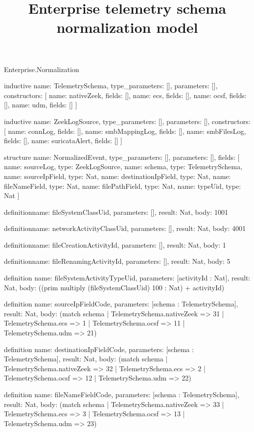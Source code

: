\begin{lexlean}{Enterprise.Normalization}
\title{Enterprise telemetry schema normalization model}
\begin{semanticmodule}
inductive{
  name: TelemetrySchema,
  type_parameters: [],
  parameters: [],
  constructors: [
    {name: nativeZeek, fields: []},
    {name: ecs, fields: []},
    {name: ocsf, fields: []},
    {name: udm, fields: []}
  ]
}

inductive{
  name: ZeekLogSource,
  type_parameters: [],
  parameters: [],
  constructors: [
    {name: connLog, fields: []},
    {name: smbMappingLog, fields: []},
    {name: smbFilesLog, fields: []},
    {name: suricataAlert, fields: []}
  ]
}

structure{
  name: NormalizedEvent,
  type_parameters: [],
  parameters: [],
  fields: [
    {name: sourceLog, type: ZeekLogSource},
    {name: schema, type: TelemetrySchema},
    {name: sourceIpField, type: Nat},
    {name: destinationIpField, type: Nat},
    {name: fileNameField, type: Nat},
    {name: filePathField, type: Nat},
    {name: typeUid, type: Nat}
  ]
}

definition{name: fileSystemClassUid, parameters: [], result: Nat, body: 1001}

definition{name: networkActivityClassUid, parameters: [], result: Nat, body: 4001}

definition{name: fileCreationActivityId, parameters: [], result: Nat, body: 1}

definition{name: fileRenamingActivityId, parameters: [], result: Nat, body: 5}

definition{
  name: fileSystemActivityTypeUid,
  parameters: [activityId : Nat],
  result: Nat,
  body: ((prim multiply (fileSystemClassUid) 100 : Nat) + activityId)
}

definition{
  name: sourceIpFieldCode,
  parameters: [schema : TelemetrySchema],
  result: Nat,
  body: (match schema
    | TelemetrySchema.nativeZeek => 31
    | TelemetrySchema.ecs => 1
    | TelemetrySchema.ocsf => 11
    | TelemetrySchema.udm => 21)
}

definition{
  name: destinationIpFieldCode,
  parameters: [schema : TelemetrySchema],
  result: Nat,
  body: (match schema
    | TelemetrySchema.nativeZeek => 32
    | TelemetrySchema.ecs => 2
    | TelemetrySchema.ocsf => 12
    | TelemetrySchema.udm => 22)
}

definition{
  name: fileNameFieldCode,
  parameters: [schema : TelemetrySchema],
  result: Nat,
  body: (match schema
    | TelemetrySchema.nativeZeek => 33
    | TelemetrySchema.ecs => 3
    | TelemetrySchema.ocsf => 13
    | TelemetrySchema.udm => 23)
}


\end{semanticmodule}
\end{lexlean}
